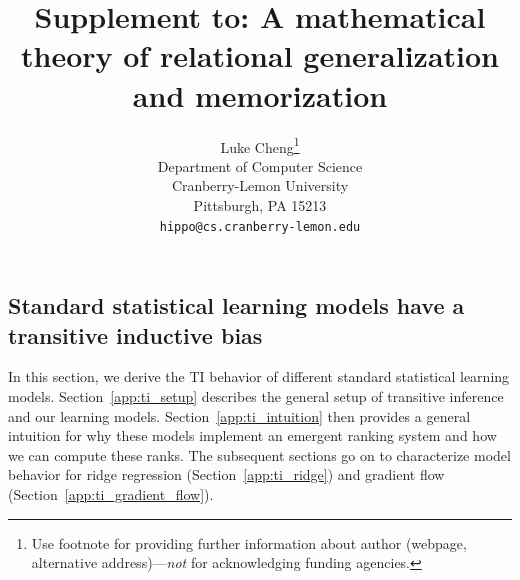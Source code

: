 \documentclass{article}
\title{Supplement to: A mathematical theory of relational generalization\\and memorization}
\author{%
  Luke Cheng\thanks{Use footnote for providing further information
    about author (webpage, alternative address)---\emph{not} for acknowledging
    funding agencies.} \\
  Department of Computer Science\\
  Cranberry-Lemon University\\
  Pittsburgh, PA 15213 \\
  \texttt{hippo@cs.cranberry-lemon.edu}
  }
\theoremstyle{plain}
\begin{document}
\maketitle

\subsection{Standard statistical learning models have a transitive inductive bias}
\label{app:transitive_inductive_bias}
In this section, we derive the TI behavior of different standard statistical learning models. Section~\ref{app:ti_setup} describes the general setup of transitive inference and our learning models. Section~\ref{app:ti_intuition} then provides a general intuition for why these models implement an emergent ranking system and how we can compute these ranks. The subsequent sections go on to characterize model behavior for ridge regression (Section~\ref{app:ti_ridge}) and gradient flow (Section~\ref{app:ti_gradient_flow}).
\end{document}
